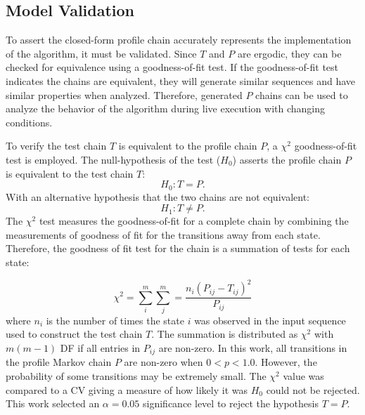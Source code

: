 \subsection{Model Validation}


To assert the closed-form profile chain accurately represents the implementation of the algorithm, it must be validated.
Since $T$ and $P$ are ergodic, they can be checked for equivalence using a goodness-of-fit test.
If the goodness-of-fit test indicates the chains are equivalent, they will generate similar sequences and have similar properties when analyzed.
Therefore, generated $P$ chains can be used to analyze the behavior of the algorithm during live execution with changing conditions.

To verify the test chain $T$ is equivalent to the profile chain $P$, a $\chi^2$ goodness-of-fit test is employed.
The null-hypothesis of the test ($H_{0}$) asserts the profile chain $P$ is equivalent to the test chain $T$:
\begin{equation} H_{0}: T = P.\end{equation}
With an alternative hypothesis that the two chains are not equivalent:
\begin{equation} H_{1}: T \neq P.\end{equation}
The $\chi^2$ test measures the goodness-of-fit for a complete chain by combining the measurements of goodness of fit for the transitions away from each state.
Therefore, the goodness of fit test for the chain is a summation of tests for each state:\cite{MARKOV3}

\begin{equation} \chi^2 = \sum_{i}^{m} \sum_{j}^{m} = \frac{n_{i}(P_{ij}-T_{ij})^2}{P_{ij}} \end{equation}%
where $n_{i}$ is the number of times the state $i$ was observed in the input sequence used to construct the test chain $T$.
The summation is distributed as $\chi^2$ with $m(m-1)$ \ac{DF} if all entries in $P_{ij}$ are non-zero.
In this work, all transitions in the profile Markov chain $P$ are non-zero when $0<p<1.0$.
However, the probability of some transitions may be extremely small.
The $\chi^2$ value was compared to a \ac{CV} giving a measure of how likely it was $H_{0}$ could not be rejected.
This work selected an $\alpha = 0.05$ significance level to reject the hypothesis $T=P$.

